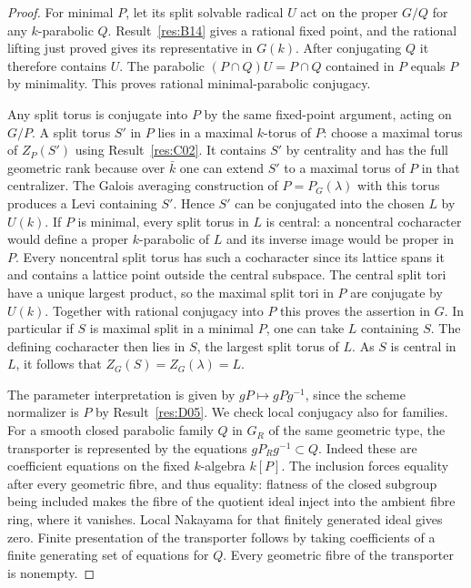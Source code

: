 \documentclass[11pt,a4paper,openany,oneside]{book}
\theoremstyle{resultstyle}
\theoremstyle{definition}
\numberwithin{equation}{chapter}
\begin{document}
\begin{proof}
For minimal \(P\), let its split solvable radical \(U\)
act on the proper \(G/Q\) for any \(k\)-parabolic \(Q\).
Result~\ref{res:B14} gives a rational fixed point,
and the rational lifting just proved gives its
representative in \(G(k)\). After conjugating \(Q\)
it therefore contains \(U\).
The parabolic \((P\cap Q)U=P\cap Q\) contained
in \(P\) equals \(P\) by minimality. This proves
rational minimal-parabolic conjugacy.

Any split torus is conjugate into \(P\) by the same
fixed-point argument, acting on \(G/P\).
A split torus \(S'\) in \(P\) lies in a maximal
\(k\)-torus of \(P\): choose a maximal torus of
\(Z_P(S')\) using Result~\ref{res:C02}. It contains
\(S'\) by centrality and has the full geometric rank
because over \(\bar k\) one can extend \(S'\) to a maximal
torus of \(P\) in that centralizer.
The Galois averaging construction of \(P=P_G(\lambda)\)
with this torus produces a Levi containing \(S'\).
Hence \(S'\) can be conjugated into the chosen \(L\)
by \(U(k)\).
If \(P\) is minimal, every split torus in \(L\) is central:
a noncentral cocharacter would define a proper \(k\)-parabolic
of \(L\) and its inverse image would be proper in \(P\).
Every noncentral split torus has such a cocharacter since
its lattice spans it and contains a lattice point outside
the central subspace. The central split tori have a unique
largest product, so the maximal split tori in \(P\) are
conjugate by \(U(k)\). Together with rational conjugacy
into \(P\) this proves the assertion in \(G\).
In particular if \(S\) is maximal split in a minimal \(P\),
one can take \(L\) containing \(S\). The defining cocharacter
then lies in \(S\), the largest split torus of \(L\).
As \(S\) is central in \(L\), it follows that
\(Z_G(S)=Z_G(\lambda)=L\).

The parameter interpretation is given by
\(gP\mapsto gPg^{-1}\), since the scheme normalizer
is \(P\) by Result~\ref{res:D05}. We check local
conjugacy also for families. For a smooth closed parabolic
family \(Q\) in \(G_R\) of the same geometric type,
the transporter is represented by the equations
\(gP_Rg^{-1}\subset Q\). Indeed these are coefficient
equations on the fixed \(k\)-algebra \(k[P]\).
The inclusion forces equality after every geometric
fibre, and thus equality: flatness of the closed
subgroup being included makes the fibre of the
quotient ideal inject into the ambient fibre ring,
where it vanishes. Local Nakayama for that finitely
generated ideal gives zero. Finite presentation of
the transporter follows by taking coefficients of a
finite generating set of equations for \(Q\).
Every geometric fibre of the transporter is nonempty.


\end{proof}
\end{document}
